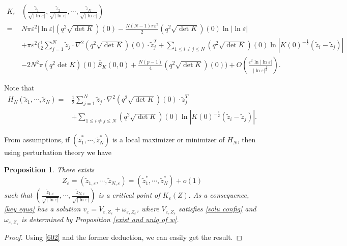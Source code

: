 \documentclass[12pt,reqno]{amsart}
\numberwithin{equation}{section}
\newtheorem{proposition}[theorem]{Proposition}
\theoremstyle{definition}
\theoremstyle{remark}
\begin{document}
\begin{equation}\label{602}
\begin{split}
K_\varepsilon&\left (\frac{\tilde{z}_1}{\sqrt{|\ln\varepsilon|}},\frac{\tilde{z}_2}{\sqrt{|\ln\varepsilon|}},\cdots,\frac{\tilde{z}_N}{\sqrt{|\ln\varepsilon|}}\right )\\
=&N\pi\varepsilon^2|\ln\varepsilon|\left( q^2\sqrt{\det K}\right)(0)-\frac{N(N-1)\pi\varepsilon^2}{2}\left( q^2 \sqrt{\det K} \right)(0)\ln|\ln\varepsilon|\\
&+\pi\varepsilon^2\bigg(  \frac{1}{2}\sum_{j=1}^N\tilde{z}_j\cdot \nabla^2\left(q^2\sqrt{\det K} \right)(0 )\cdot\tilde{z}_j^T+\sum_{1\leq i\neq j\leq N}\left( q^2  \sqrt{\det K}\right)(0)\ln| K(0)^{-\frac{1}{2}}\left( \tilde{z}_i - \tilde{z}_j\right)  |     \\
&-2N^2\pi   \left( q^2  \det K\right)(0) \bar{S}_K(0,0)+ \frac{N(p-1)}{4}   \left( q^2\sqrt{\det K}\right) (0)   \bigg)
+O\left( \frac{\varepsilon^2\ln|\ln\varepsilon|}{|\ln\varepsilon|^{\frac{1}{2}}}\right).
\end{split}
\end{equation}

Note that %
\begin{equation*} 
\begin{split}
H_N(\tilde{z}_1,\cdots, \tilde{z}_N)=&\frac{1}{2}\sum_{j=1}^N\tilde{z}_j\cdot \nabla^2\left(q^2\sqrt{\det K} \right)(0 )\cdot\tilde{z}_j^T\\
&+\sum_{1\leq i\neq j\leq N}\left( q^2  \sqrt{\det K}\right)(0)\ln| K(0)^{-\frac{1}{2}}\left( \tilde{z}_i - \tilde{z}_j\right)  |.
\end{split}
\end{equation*}

From assumptions, if $ \left( \tilde{z}_1^*,\cdots, \tilde{z}_N^*\right)  $ is a local maximizer or minimizer of $ H_N $, then using perturbation theory we have 
\begin{proposition}\label{prop6-1}
	There exists $$ Z_\varepsilon=\left( \tilde{z}_{1,\varepsilon},\cdots, \tilde{z}_{N,\varepsilon}\right)=\left( \tilde{z}_1^*,\cdots, \tilde{z}_N^*\right)+o(1)$$ such that $ \left( \frac{\tilde{z}_{1,\varepsilon}}{\sqrt{|\ln\varepsilon|}},\cdots, \frac{\tilde{z}_{N,\varepsilon}}{\sqrt{|\ln\varepsilon|}}\right) $ is a critical point of $ K_\varepsilon(Z).$ As a consequence,  \eqref{key equa} has a solution $ v_\varepsilon= V_{\varepsilon,Z_\varepsilon}+\omega_{\varepsilon,Z_\varepsilon} $, where $ V_{\varepsilon,Z_\varepsilon} $ satisfies \eqref{solu config} and $ \omega_{\varepsilon,Z_\varepsilon} $ is determined by Proposition \ref{exist and uniq of w}.
\end{proposition}
\begin{proof}
Using \eqref{602} and the former deduction, we can easily get the result.
\end{proof}
\end{document}
